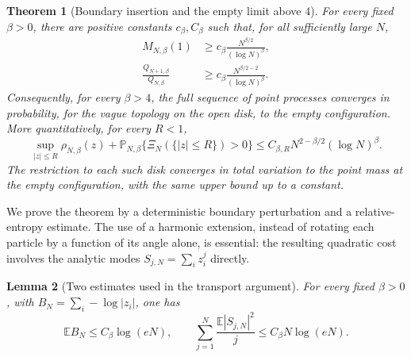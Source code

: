\documentclass[11pt,a4paper]{article}
\numberwithin{equation}{section}
\newtheorem{theorem}{Theorem}[section]
\newtheorem{lemma}[theorem]{Lemma}
\theoremstyle{definition}
\theoremstyle{remark}
\begin{document}
\begin{theorem}[Boundary insertion and the empty limit above $4$]
\label{thm:empty-limit-beta-above-four}
For every fixed $\beta>0$, there are positive constants $c_\beta,C_\beta$
such that, for all sufficiently large $N$,
\begin{align}
 M_{N,\beta}(1)
 &\geq c_\beta\frac{N^{\beta/2}}{(\log N)^\beta},
 \label{eq:harmonic-boundary-moment-lower}\\
 \frac{Q_{N+1,\beta}}{Q_{N,\beta}}
 &\geq c_\beta\frac{N^{\beta/2-2}}{(\log N)^\beta}.
 \label{eq:harmonic-boundary-ratio-lower}
\end{align}
Consequently, for every $\beta>4$, the full sequence of point processes
converges in probability, for the vague topology on the open disk, to
the empty configuration. More quantitatively, for every $R<1$,
\begin{equation}
 \sup_{|z|\leq R}\rho_{N,\beta}(z)
 +\mathbb P_{N,\beta}\{\Xi_N(\{|z|\leq R\})>0\}
 \leq C_{\beta,R}N^{2-\beta/2}(\log N)^\beta.
 \label{eq:empty-limit-beta-above-four-rate}
\end{equation}
The restriction to each such disk converges in total variation to the
point mass at the empty configuration, with the same upper bound up to
a constant.
\end{theorem}

We prove the theorem by a deterministic boundary perturbation and a
relative-entropy estimate. The use of a harmonic extension, instead of
rotating each particle by a function of its angle alone, is essential:
the resulting quadratic cost involves the analytic modes
$S_{j,N}=\sum_i z_i^j$ directly.

\begin{lemma}[Two estimates used in the transport argument]
\label{lem:harmonic-transport-inputs}
For every fixed $\beta>0$, with $B_N=\sum_i-\log|z_i|$, one has
\begin{equation}
 \mathbb E B_N\leq C_\beta\log(eN),\qquad
 \sum_{j=1}^N\frac{\mathbb E|S_{j,N}|^2}{j}
 \leq C_\beta N\log(eN).
 \label{eq:harmonic-transport-inputs}
\end{equation}
\end{lemma}
\end{document}
